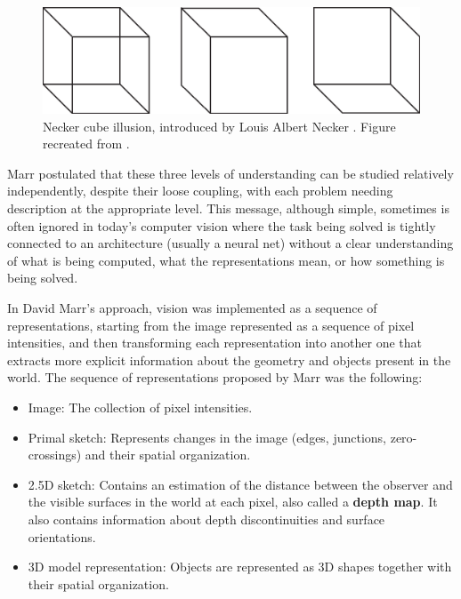 \begin{figure}[t]
    \centerline{
        \includegraphics[width=.9\linewidth]{figures/taxonomy/necker.eps}
    }
    \caption{Necker cube illusion, introduced by Louis Albert Necker \cite{Necker1832}. Figure recreated from \cite{Marr82}.}
    \label{fig:necker_cube}
\end{figure}


Marr postulated that these three levels of understanding can be studied relatively independently, despite their loose coupling, with
each problem needing description at the appropriate level. This message, although simple, sometimes is often ignored in today’s computer vision where the task being solved is tightly connected to an architecture (usually a neural net) without a clear understanding of what is being computed, what the representations mean, or how something is being solved.


In David Marr’s approach, vision was implemented as a sequence of representations, starting from the image represented as a sequence of pixel intensities, and then transforming each representation into another one that extracts more explicit information about the geometry and objects present in the world. The sequence of representations proposed by Marr was the following:

\begin{itemize}
    \item Image: The collection of pixel intensities.
    \item Primal sketch: Represents changes in the image (edges, junctions, zero-crossings) and their spatial organization.
    \item 2.5D sketch: Contains an estimation of the distance between the observer and the visible surfaces in the world at each pixel, also called a {\bf depth map}. It also contains information about depth discontinuities and surface orientations.
    \item 3D model representation: Objects are represented as 3D shapes together with their spatial organization.
\end{itemize}


